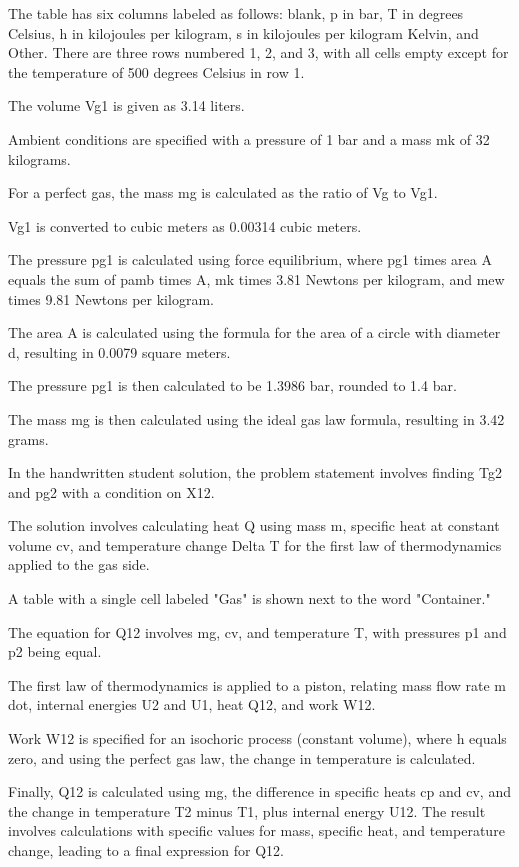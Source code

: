 The table has six columns labeled as follows: blank, p in bar, T in degrees Celsius, h in kilojoules per kilogram, s in kilojoules per kilogram Kelvin, and Other. There are three rows numbered 1, 2, and 3, with all cells empty except for the temperature of 500 degrees Celsius in row 1.

The volume Vg1 is given as 3.14 liters.

Ambient conditions are specified with a pressure of 1 bar and a mass mk of 32 kilograms.

For a perfect gas, the mass mg is calculated as the ratio of Vg to Vg1.

Vg1 is converted to cubic meters as 0.00314 cubic meters.

The pressure pg1 is calculated using force equilibrium, where pg1 times area A equals the sum of pamb times A, mk times 3.81 Newtons per kilogram, and mew times 9.81 Newtons per kilogram.

The area A is calculated using the formula for the area of a circle with diameter d, resulting in 0.0079 square meters.

The pressure pg1 is then calculated to be 1.3986 bar, rounded to 1.4 bar.

The mass mg is then calculated using the ideal gas law formula, resulting in 3.42 grams.

In the handwritten student solution, the problem statement involves finding Tg2 and pg2 with a condition on X12.

The solution involves calculating heat Q using mass m, specific heat at constant volume cv, and temperature change Delta T for the first law of thermodynamics applied to the gas side.

A table with a single cell labeled "Gas" is shown next to the word "Container."

The equation for Q12 involves mg, cv, and temperature T, with pressures p1 and p2 being equal.

The first law of thermodynamics is applied to a piston, relating mass flow rate m dot, internal energies U2 and U1, heat Q12, and work W12.

Work W12 is specified for an isochoric process (constant volume), where h equals zero, and using the perfect gas law, the change in temperature is calculated.

Finally, Q12 is calculated using mg, the difference in specific heats cp and cv, and the change in temperature T2 minus T1, plus internal energy U12. The result involves calculations with specific values for mass, specific heat, and temperature change, leading to a final expression for Q12.